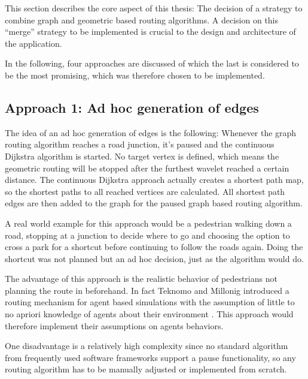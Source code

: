 	This section describes the core aspect of this thesis:
	The decision of a strategy to combine graph and geometric based routing algorithms.
	A decision on this \enquote{merge} strategy to be implemented is crucial to the design and architecture of the application.
	
	In the following, four approaches are discussed of which the last is considered to be the most promising, which was therefore chosen to be implemented.
	
	\subsection{Approach 1: Ad hoc generation of edges}
	
		The idea of an ad hoc generation of edges is the following:
		Whenever the graph routing algorithm reaches a road junction, it's paused and the continuous Dijkstra algorithm is started.
		No target vertex is defined, which means the geometric routing will be stopped after the furthest wavelet reached a certain distance.
		The continuous Dijkstra approach actually creates a shortest path map, so the shortest paths to all reached vertices are calculated.
		All shortest path edges are then added to the graph for the paused graph based routing algorithm.
		
		A real world example for this approach would be a pedestrian walking down a road, stopping at a junction to decide where to go and choosing the option to cross a park for a shortcut before continuing to follow the roads again.
		Doing the shortcut was not planned but an ad hoc decision, just as the algorithm would do.
		
		The advantage of this approach is the realistic behavior of pedestrians not planning the route in beforehand.
		In fact Teknomo and Millonig introduced a routing mechanism for agent based simulations with the assumption of little to no apriori knowledge of agents about their environment \cite{teknomo-millonig-routing}.
		This approach would therefore implement their assumptions on agents behaviors.
		
		One disadvantage is a relatively high complexity since no standard algorithm from frequently used software frameworks support a pause functionality, so any routing algorithm has to be manually adjusted or implemented from scratch.
		
